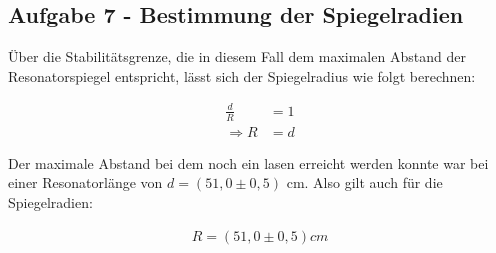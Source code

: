 \subsection{Aufgabe 7 - Bestimmung der Spiegelradien}
Über die Stabilitätsgrenze, die in diesem Fall dem maximalen Abstand der Resonatorspiegel entspricht, lässt sich der Spiegelradius wie folgt berechnen:

\begin{align}
\frac{d}{R} &= 1 \\
\Rightarrow R &= d
\end{align}

Der maximale Abstand bei dem noch ein lasen erreicht werden konnte war bei einer Resonatorlänge von $d = (51,0 \pm 0,5)$ cm.
Also gilt auch für die Spiegelradien:

\begin{align}
R = (51,0 \pm 0,5)cm
\end{align}


